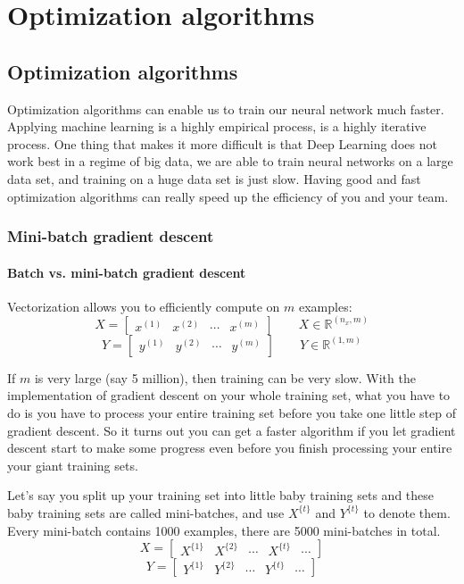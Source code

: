 \documentclass[UTF8]{article}
\newcommand{\Vector}[1]{\boldsymbol{\mathit{#1}}}   %
\newcommand{\Matrix}[1]{\boldsymbol{\mathit{#1}}}   %
\newcommand{\Set}[1]{\mathbb{#1}}                   %
\begin{document}
\section{Optimization algorithms}

\subsection{Optimization algorithms}
Optimization algorithms can enable us to train our neural network much faster. Applying machine
learning is a highly empirical process, is a highly iterative process. One thing that makes it
more difficult is that Deep Learning does not work best in a regime of big data, we are able to
train neural networks on a large data set, and training on a huge data set is just slow. Having
good and fast optimization algorithms can really speed up the efficiency of you and your team.

\subsubsection{Mini-batch gradient descent}
\paragraph{Batch vs. mini-batch gradient descent}
Vectorization allows you to efficiently compute on $m$ examples:
$$ \Matrix{X} = \left[\begin{array}{cccc} \Vector{x^{(1)}} & \Vector{x^{(2)}} & \cdots
& \Vector{x^{(m)}}\end{array}\right] \qquad \Matrix{X} \in \Set{R}^{(n_x, m)} $$
$$ \Matrix{Y} = \left[\begin{array}{cccc} \Vector{y^{(1)}} & \Vector{y^{(2)}} & \cdots
& \Vector{y^{(m)}}\end{array}\right] \qquad \Matrix{Y} \in \Set{R}^{(1, m)} $$

If $m$ is very large (say 5 million), then training can be very slow. With the implementation of
gradient descent on your whole training set, what you have to do is you have to process your entire
training set before you take one little step of gradient descent. So it turns out you can get a
faster algorithm if you let gradient descent start to make some progress even before you finish
processing your entire your giant training sets.

Let's say you split up your training set into little baby training sets and these baby training
sets are called mini-batches, and use $\Matrix{X^{\{t\}}}$ and $\Matrix{Y^{\{t\}}}$ to denote them.
Every mini-batch contains 1000 examples, there are 5000 mini-batches in total.
$$ \Matrix{X} = \left[\begin{array}{ccccc} \Matrix{X^{\{1\}}} & \Matrix{X^{\{2\}}} & \cdots
& \Matrix{X^{\{t\}}} & \cdots \end{array}\right] $$
$$ \Matrix{Y} = \left[\begin{array}{ccccc} \Matrix{Y^{\{1\}}} & \Matrix{Y^{\{2\}}} & \cdots
& \Matrix{Y^{\{t\}}} & \cdots \end{array}\right] $$
\end{document}

